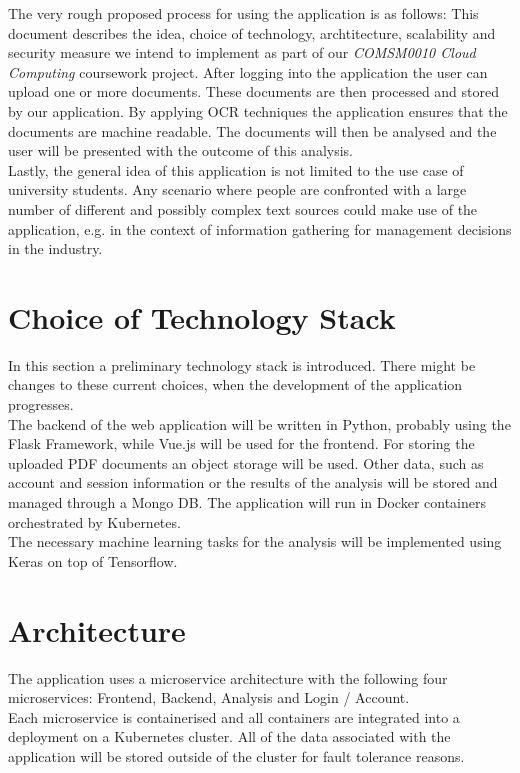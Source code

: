 \documentclass[conference]{IEEEtran}
\begin{document}
The very rough proposed process for using the application is as follows: This document describes the
idea, choice of technology, archtitecture, scalability and security measure we intend to implement as
part of our \textit{COMSM0010 Cloud Computing} coursework project. After logging into the application the user can
upload one or more documents. These documents are then processed and stored by our application. By applying
OCR techniques the application ensures that the documents are machine readable. The documents will then
be analysed and the user will be presented with the outcome of this analysis. \\

Lastly, the general idea of this application is not limited to the use case of university students.
Any scenario where people are confronted with a large number of different and possibly complex text
sources could make use of the application, e.g. in the context of information gathering for management
decisions in the industry.

\section{Choice of Technology Stack}
In this section a  preliminary technology stack is introduced. There might be changes to these current
choices, when the development of the application progresses. \\
The backend of the web application will be written in Python, probably using the Flask Framework, 
while Vue.js will be used for the frontend.
For storing the uploaded PDF documents an object storage will be used. Other data, such as account and
session information or the results of the analysis will be stored and managed through a Mongo DB.
The application will run in Docker containers orchestrated by Kubernetes. \\
The necessary machine learning tasks for the analysis will be implemented using Keras on top of Tensorflow.

\section{Architecture}
The application uses a microservice architecture with the following four microservices: Frontend, Backend,
Analysis and Login / Account. \\
Each microservice is containerised and all containers are integrated into a deployment on a Kubernetes cluster.
All of the data associated with the application will be stored outside of the cluster for fault tolerance
reasons.
\end{document}
